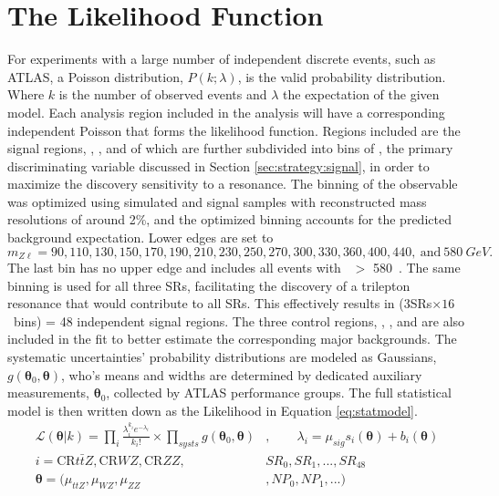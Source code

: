 \section{The Likelihood Function}
For experiments with a large number of independent discrete events, such as ATLAS, a Poisson distribution, $P(k;\lambda)$, is the valid probability distribution.
Where $k$ is the number of observed events and $\lambda$ the expectation of the given model.
Each analysis region included in the analysis will have a corresponding independent Poisson that forms the likelihood function.
Regions included are the signal regions, \SRTL, \SRFour, and \SRThree of which are further subdivided into bins of \mZl, the primary discriminating variable discussed in Section \ref{sec:strategy:signal}, in order to maximize the discovery sensitivity to a resonance. 
The binning of the \mZl observable was optimized using simulated \CCsignal and \CNsignal signal samples with reconstructed mass resolutions of around 2\%, and the optimized binning accounts for the predicted background expectation.
Lower edges are set to
\begin{equation}
  m_{Z\ell} = 90, 110, 130, 150, 170, 190, 210, 230, 250, 270, 300, 330, 360, 400, 440, \mathrm{~and~}580~GeV.
  \label{eq:binning}
\end{equation}
The last bin has no upper edge and includes all events with \mZl\ $>$ 580~\GeV.
The same binning is used for all three SRs, facilitating the discovery of a trilepton resonance that would contribute to all SRs.
This effectively results in (3SRs$\times 16 $~\mZl bins) = 48 independent signal regions.
The three control regions, \CRWZ, \CRttZ, and \CRZZ are also included in the fit to better estimate the corresponding major backgrounds.
The systematic uncertainties' probability distributions are modeled as Gaussians, $g(\boldsymbol\theta_{0}, \boldsymbol\theta)$, who's means and widths are determined by dedicated auxiliary measurements, $\boldsymbol\theta_{0}$, collected by ATLAS performance groups.
The full statistical model is then written down as the Likelihood in Equation \ref{eq:statmodel}.
\begin{equation}
\begin{split}
    \mathcal{L}(\boldsymbol\theta|k)=\prod_{i}\frac{\lambda_{i}^{k_{i}}e^{-\lambda_{i}}}{k_{i}!}\times \prod_{systs}g(\boldsymbol\theta_{0},\boldsymbol\theta)& , \qquad
    \lambda_{i} = \mu_{sig} s_{i}(\boldsymbol\theta)+b_{i}(\boldsymbol\theta) \\
    i = \textrm{CR}t\bar{t}Z,\textrm{CR}WZ,\textrm{CR}ZZ, &SR_{0}, SR_{1},..., SR_{48}  \\
    \boldsymbol\theta = (\mu_{ttZ},\mu_{WZ},\mu_{ZZ}&, NP_{0}, NP_{1}, ...)
\end{split}
\label{eq:statmodel}
\end{equation}
